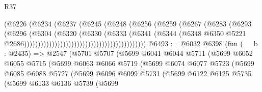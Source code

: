\begin{lexlean}{R37}
\begin{coremodule}
                                                        (@6226
                                                          (@6234
                                                            (@6237
                                                              (@6245
                                                                (@6248
                                                                  (@6256
                                                                    (@6259
                                                                      (@6267
                                                                        (@6283
                                                                          (@6293
                                                                            (@6296
                                                                              (@6304
                                                                                (@6320
                                                                                  (@6330
                                                                                    (@6333
                                                                                      (@6341
                                                                                        (@6344
                                                                                          (@6348
                                                                                            @6350
                                                                                            @5221
                                                                                            @2686))))))))))))))))))))))))))))))))))))))))))))
@6493 := @6032
    @6398
    (fun (__b : @2435) =>
    @2547
      (@5701
        @5707
        (@5699
          @6041
          @6044
          @5711
          (@5699
            @6052
            @6055
            @5715
            (@5699
              @6063
              @6066
              @5719
              (@5699
                @6074
                @6077
                @5723
                (@5699
                  @6085
                  @6088
                  @5727
                  (@5699
                    @6096
                    @6099
                    @5731
                    (@5699
                      @6122
                      @6125
                      @5735
                      (@5699
                        @6133
                        @6136
                        @5739
                        (@5699

\end{coremodule}
\end{lexlean}
